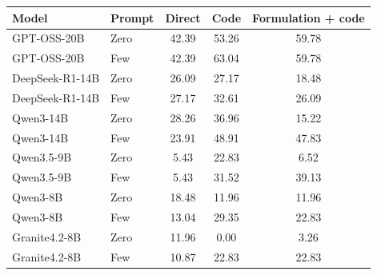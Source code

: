 \begin{tabular}{llccc}
\toprule
Model & Prompt & Direct & Code & Formulation + code \\
\midrule
GPT-OSS-20B & Zero & 42.39 & 53.26 & 59.78 \\
GPT-OSS-20B & Few & 42.39 & 63.04 & 59.78 \\
DeepSeek-R1-14B & Zero & 26.09 & 27.17 & 18.48 \\
DeepSeek-R1-14B & Few & 27.17 & 32.61 & 26.09 \\
Qwen3-14B & Zero & 28.26 & 36.96 & 15.22 \\
Qwen3-14B & Few & 23.91 & 48.91 & 47.83 \\
Qwen3.5-9B & Zero & 5.43 & 22.83 & 6.52 \\
Qwen3.5-9B & Few & 5.43 & 31.52 & 39.13 \\
Qwen3-8B & Zero & 18.48 & 11.96 & 11.96 \\
Qwen3-8B & Few & 13.04 & 29.35 & 22.83 \\
Granite4.2-8B & Zero & 11.96 & 0.00 & 3.26 \\
Granite4.2-8B & Few & 10.87 & 22.83 & 22.83 \\
\bottomrule
\end{tabular}
